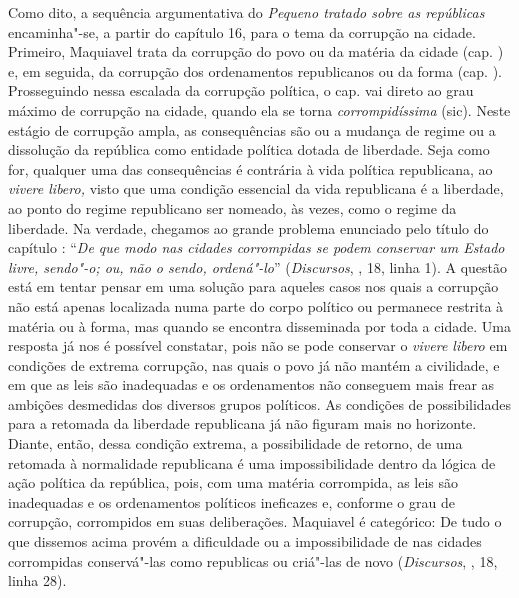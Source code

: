 Como dito, a sequência argumentativa do \emph{Pequeno tratado sobre as
repúblicas} encaminha"-se, a partir do capítulo 16, para o tema da
corrupção na cidade. Primeiro, Maquiavel trata da corrupção do povo ou
da matéria da cidade (cap. ) e, em seguida, da corrupção dos
ordenamentos republicanos ou da forma (cap. ). Prosseguindo nessa
escalada da corrupção política, o cap.  vai direto ao grau máximo
de corrupção na cidade, quando ela se torna \emph{corrompidíssima}
(sic). Neste estágio de corrupção ampla, as consequências são ou a
mudança de regime ou a dissolução da república como entidade política
dotada de liberdade. Seja como for, qualquer uma das consequências é
contrária à vida política republicana, ao \emph{vivere libero,} visto
que uma condição essencial da vida republicana é a liberdade, ao ponto
do regime republicano ser nomeado, às vezes, como o regime da liberdade.
Na verdade, chegamos ao grande problema enunciado pelo título do
capítulo : ``\emph{De que modo nas cidades corrompidas se podem
conservar um Estado livre, sendo"-o; ou, não o sendo, ordená"-lo}''
(\emph{Discursos}, , 18, linha 1). A questão está em tentar pensar em
uma solução para aqueles casos nos quais a corrupção não está apenas
localizada numa parte do corpo político ou permanece restrita à matéria
ou à forma, mas quando se encontra disseminada por toda a cidade. Uma
resposta já nos é possível constatar, pois não se pode conservar o
\emph{vivere libero} em condições de extrema corrupção, nas quais o povo
já não mantém a civilidade, e em que as leis são inadequadas e os
ordenamentos não conseguem mais frear as ambições desmedidas dos
diversos grupos políticos. As condições de possibilidades para a
retomada da liberdade republicana já não figuram mais no horizonte.
Diante, então, dessa condição extrema, a possibilidade de retorno, de
uma retomada à normalidade republicana é uma impossibilidade dentro da
lógica de ação política da república, pois, com uma matéria corrompida,
as leis são inadequadas e os ordenamentos políticos ineficazes e,
conforme o grau de corrupção, corrompidos em suas deliberações.
Maquiavel é categórico: De tudo o que dissemos acima provém a
dificuldade ou a impossibilidade de nas cidades corrompidas conservá"-las
como republicas ou criá"-las de novo (\emph{Discursos}, , 18, linha 28).

